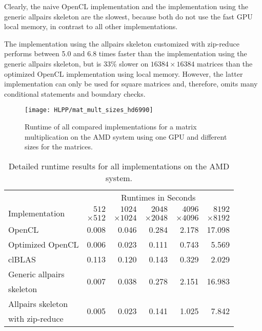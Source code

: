 Clearly, the naive OpenCL implementation and the implementation using the generic allpairs skeleton are the slowest, because both do not use the fast GPU local memory, in contrast to all other implementations.

The implementation using the allpairs skeleton customized with zip-reduce performs between 5.0 and 6.8 times faster than the implementation using the generic allpairs skeleton, but is 33\% slower on $16384\times 16384$ matrices than the optimized OpenCL implementation using local memory.
However, the latter implementation can only be used for square matrices and, therefore, omits many conditional statements and boundary checks.

\begin{figure}[b]
  \centering
  \texttt{[image: HLPP/mat\_mult\_sizes\_hd6990]}
  \caption{Runtime of all compared implementations for a matrix multiplication on the AMD system using one GPU and different sizes for the matrices.}
  \label{fig:mat_mult_single_amd}
\end{figure}
\begin{table}[b]
  \centering
  \begin{tabular}{lrrrrr}
    \toprule
              & \multicolumn{5}{c}{Runtimes in Seconds} \\
    \cmidrule(r){2-6}
    \multirow{2}{*}{Implementation} & $512$ & $1024$ & $2048$ & $4096$ & $8192$ \\
                                    & $\times 512$ & $\times 1024$ & $\times 2048$ & $\times 4096$ & $\times 8192$ \\
    \midrule
    OpenCL            & 0.008 & 0.046 & 0.284 & 2.178 & 17.098 \\
    Optimized OpenCL  & 0.006 & 0.023 & 0.111 & 0.743 &  5.569 \\
    clBLAS            & 0.113 & 0.120 & 0.143 & 0.329 &  2.029 \\
    Generic allpairs  & \multirow{2}{*}{0.007} & \multirow{2}{*}{0.038} & \multirow{2}{*}{0.278} & \multirow{2}{*}{2.151} & \multirow{2}{*}{16.983} \\
    skeleton\\
    Allpairs skeleton & \multirow{2}{*}{0.005} & \multirow{2}{*}{0.023} & \multirow{2}{*}{0.141} & \multirow{2}{*}{1.025} & \multirow{2}{*}{7.842} \\
    with zip-reduce\\
    \bottomrule
  \end{tabular}
  \caption{Detailed runtime results for all implementations on the AMD system.}
  \label{tab:mat_mult_single_amd}
\end{table}

